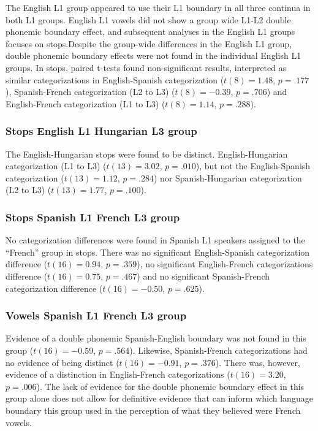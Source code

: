 \documentclass[
  man]{apa6}
\begin{document}
The English L1 group appeared to use their L1 boundary in all three continua in both L1 groups. English L1 vowels did not show a group wide L1-L2 double phonemic boundary effect, and subsequent analyses in the English L1 groups focuses on stops.Despite the group-wide differences in the English L1 group, double phonemic boundary effects were not found in the individual English L1 groups. In stops, paired t-tests found non-significant results, interpreted as similar categorizations in English-Spanish categorization (\(t(8) = 1.48\), \(p = .177\)), Spanish-French categorization (L2 to L3) (\(t(8) = -0.39\), \(p = .706\)) and English-French categorization (L1 to L3) (\(t(8) = 1.14\), \(p = .288\)).

\hypertarget{stops-english-l1-hungarian-l3-group}{%
\subsubsection{Stops English L1 Hungarian L3 group}\label{stops-english-l1-hungarian-l3-group}}

The English-Hungarian stops were found to be distinct. English-Hungarian categorization (L1 to L3) (\(t(13) = 3.02\), \(p = .010\)), but not the English-Spanish categorization (\(t(13) = 1.12\), \(p = .284\)) nor Spanish-Hungarian categorization (L2 to L3) (\(t(13) = 1.77\), \(p = .100\)).

\hypertarget{stops-spanish-l1-french-l3-group}{%
\subsubsection{Stops Spanish L1 French L3 group}\label{stops-spanish-l1-french-l3-group}}

No categorization differences were found in Spanish L1 speakers assigned to the ``French'' group in stops. There was no significant English-Spanish categorization difference (\(t(16) = 0.94\), \(p = .359\)), no significant English-French categorizations difference (\(t(16) = 0.75\), \(p = .467\)) and no significant Spanish-French categorization difference (\(t(16) = -0.50\), \(p = .625\)).

\hypertarget{vowels-spanish-l1-french-l3-group}{%
\subsubsection{Vowels Spanish L1 French L3 group}\label{vowels-spanish-l1-french-l3-group}}

Evidence of a double phonemic Spanish-English boundary was not found in this group (\(t(16) = -0.59\), \(p = .564\)). Likewise, Spanish-French categorizations had no evidence of being distinct (\(t(16) = -0.91\), \(p = .376\)). There was, however, evidence of a distinction in English-French categorizations (\(t(16) = 3.20\), \(p = .006\)). The lack of evidence for the double phonemic boundary effect in this group alone does not allow for definitive evidence that can inform which language boundary this group used in the perception of what they believed were French vowels.
\end{document}
